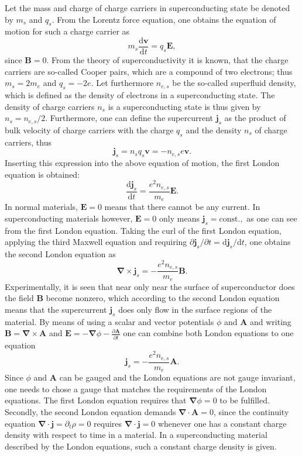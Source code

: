 \documentclass{report}
\numberwithin{tm}{section}
\newcommand\vect[1]{\ensuremath{\bm{#1}}}
\begin{document}
Let the mass and charge of charge carriers in superconducting state be denoted by $m_s$ and $q_s$. From the Lorentz force equation, one obtains the equation of motion for such a charge carrier as \begin{equation}
	m_s \frac{\mathrm{d}\vect{v}}{\mathrm{d}t} = q_s\vect{E},
\end{equation} since $\vect{B} = 0$. From the theory of superconductivity it is known, that the charge carriers are so-called Cooper pairs, which are a compound of two electrons; thus $m_s = 2m_e$ and $q_s = -2e$. Let furthermore $n_{e,s}$ be the so-called superfluid density, which is defined as the density of electrons in a superconducting state. The density of charge carriers $n_s$ is a superconducting state is thus given by $n_s = n_{e,s}/2$. Furthermore, one can define the supercurrent $\vect{j}_s$ as the product of bulk velocity of charge carriers with the charge $q_s$ and the density $n_s$ of charge carriers, thus \begin{equation}
\vect{j}_s = n_sq_s\vect{v} = -n_{e,s}e\vect{v}.
\end{equation} Inserting this expression into the above equation of motion, the first London equation is obtained:
\begin{equation}
	\frac{\mathrm{d}\vect{j}_s}{\mathrm{d}t} = \frac{e^2 n_{e,s}}{m_e}\vect{E}.
\end{equation} In normal materials, $\vect{E} = 0$ means that there cannot be any current. In superconducting materials however, $\vect{E} = 0$ only means $\vect{j}_s = \text{const.},$ as one can see from the first London equation. Taking the curl of the first London equation, applying the third Maxwell equation and requiring $\partial \vect{j}_s/\partial t = \mathrm{d}\vect{j}_s/\mathrm{d}t$, one obtains the second London equation as \begin{equation}
\vect{\nabla}\times \vect{j}_s = -\frac{e^2n_{e,s}}{m_e}\vect{B}.
\end{equation} Experimentally, it is seen that near only near the surface of superconductor does the field $\vect{B}$ become nonzero, which according to the second London equation means that the supercurrent $\vect{j}_s$ does only flow in the surface regions of the material. By means of using a scalar and vector potentials $\phi$ and $\vect{A}$ and writing $\vect{B} = \vect{\nabla}\times \vect{A}$ and $\vect{E} = -\vect{\nabla}\phi - \frac{\partial \vect{A}}{\partial t}$ one can combine both London equations to one equation \begin{equation}
\vect{j}_s = -\frac{e^2n_{e,s}}{m_e}\vect{A}.
\end{equation} Since $\phi$ and $\vect{A}$ can be gauged and the London equations are not gauge invariant, one needs to chose a gauge that matches the requirements of the London equations. The first London equation requires that $\vect{\nabla}\phi=0$ to be fulfilled. Secondly, the second London equation demands $\vect{\nabla}\cdot \vect{A} = 0$, since the continuity equation $\vect{\nabla}\cdot \vect{j} = \partial_t \rho = 0$ requires $\vect{\nabla}\cdot \vect{j} = 0$ whenever one has a constant charge density with respect to time in a material. In a superconducting material described by the London equations, such a constant charge density is given.
\end{document}
